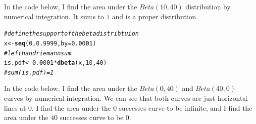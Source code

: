 \documentclass[12pt]{article}\usepackage[]{graphicx}\usepackage[]{color}
\makeatletter
\newcommand{\hlnum}[1]{\textcolor[rgb]{0.686,0.059,0.569}{#1}}%
\newcommand{\hlcom}[1]{\textcolor[rgb]{0.678,0.584,0.686}{\textit{#1}}}%
\newcommand{\hlopt}[1]{\textcolor[rgb]{0,0,0}{#1}}%
\newcommand{\hlstd}[1]{\textcolor[rgb]{0.345,0.345,0.345}{#1}}%
\newcommand{\hlkwb}[1]{\textcolor[rgb]{0.69,0.353,0.396}{#1}}%
\newcommand{\hlkwc}[1]{\textcolor[rgb]{0.333,0.667,0.333}{#1}}%
\newcommand{\hlkwd}[1]{\textcolor[rgb]{0.737,0.353,0.396}{\textbf{#1}}}%
\newenvironment{kframe}{%
 \def\at@end@of@kframe{}%
 \ifinner\ifhmode%
  \def\at@end@of@kframe{\end{minipage}}%
  \begin{minipage}{\columnwidth}%
 \fi\fi%
 \def\FrameCommand##1{\hskip\@totalleftmargin \hskip-\fboxsep
 \colorbox{shadecolor}{##1}\hskip-\fboxsep
     \hskip-\linewidth \hskip-\@totalleftmargin \hskip\columnwidth}%
 \MakeFramed {\advance\hsize-\width
   \@totalleftmargin\z@ \linewidth\hsize
   \@setminipage}}%
 {\par\unskip\endMakeFramed%
 \at@end@of@kframe}
\newenvironment{knitrout}{}{} %
\makeatother
\begin{document}
\begin{doublespacing}
\begin{enumerate}
\begin{enumerate}
In the code below, I find the area under the $Beta(10, 40)$ distribution by numerical integration. It sums to $1$ and is a proper distribution.
\begin{singlespace}
\begin{knitrout}\footnotesize
{}\color{fgcolor}\begin{kframe}
\begin{alltt}
\hlcom{#define the support of the beta distribtuion}
\hlstd{x} \hlkwb{<-} \hlkwd{seq}\hlstd{(}\hlnum{0}\hlstd{,} \hlnum{0.9999}\hlstd{,} \hlkwc{by}\hlstd{=}\hlnum{0.0001}\hlstd{)}
\hlcom{#left hand riemann sum}
\hlstd{is.pdf} \hlkwb{<-} \hlnum{0.0001}\hlopt{*}\hlkwd{dbeta}\hlstd{(x,} \hlnum{10}\hlstd{,} \hlnum{40}\hlstd{)}
\hlcom{#sum(is.pdf)=1}
\end{alltt}
\end{kframe}
\end{knitrout}
\end{singlespace}

In the code below, I find the area under the $Beta(0, 40)$ and $Beta(40, 0)$ curves by numerical integration. We can see that both curves are just horizontal lines at $0$. I find the area under the $0$ successes curve to be infinite, and I find the area under the $40$ successes curve to be $0$.


\end{enumerate}
\end{enumerate}
\end{doublespacing}
\end{document}

